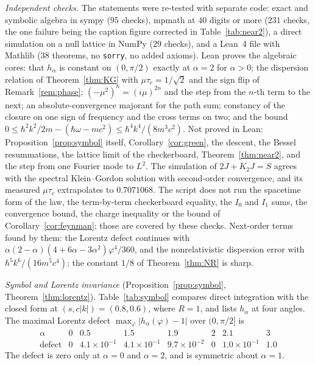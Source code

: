 \documentclass[11pt]{amsart}
\theoremstyle{definition}
\theoremstyle{remark}
\begin{document}
\emph{Independent checks.} The statements were re-tested with separate code: exact and symbolic algebra in sympy ($95$ checks), mpmath at $40$ digits or more ($231$ checks, the one failure being the caption figure corrected in Table~\ref{tab:near2}), a direct simulation on a null lattice in NumPy ($29$ checks), and a Lean~4 file with Mathlib ($38$ theorems, no \texttt{sorry}, no added axioms). Lean proves the algebraic cores: that $h_\alpha$ is constant on $(0,\pi/2)$ exactly at $\alpha=2$ for $\alpha>0$; the dispersion relation of Theorem~\ref{thm:KG} with $\mu\tau_c=1/\sqrt2$ and the sign flip of Remark~\ref{rem:phase}; $(-\mu^2)^n=(i\mu)^{2n}$ and the step from the $n$-th term to the next; an absolute-convergence majorant for the path sum; constancy of the closure on one sign of frequency and the cross terms on two; and the bound $0\le\hbar^2k^2/2m-(\hbar\omega-mc^2)\le\hbar^4k^4/(8m^3c^2)$. Not proved in Lean: Proposition~\ref{prop:symbol} itself, Corollary~\ref{cor:green}, the descent, the Bessel resummations, the lattice limit of the checkerboard, Theorem~\ref{thm:near2}, and the step from one Fourier mode to $L^2$. The simulation of $2J+K_2J=S$ agrees with the spectral Klein--Gordon solution with second-order convergence, and its measured $\mu\tau_c$ extrapolates to $0.7071068$. The script does not run the spacetime form of the law, the term-by-term checkerboard equality, the $I_0$ and $I_1$ sums, the convergence bound, the charge inequality or the bound of Corollary~\ref{cor:feynman}; those are covered by these checks. Next-order terms found by them: the Lorentz defect continues with $\alpha(2-\alpha)(4+6\alpha-3\alpha^2)\varphi^4/360$, and the nonrelativistic dispersion error with $\hbar^5k^6/(16m^5c^4)$; the constant $1/8$ of Theorem~\ref{thm:NR} is sharp.

\emph{Symbol and Lorentz invariance} (Proposition~\ref{prop:symbol}, Theorem~\ref{thm:lorentz}). Table~\ref{tab:symbol} compares direct integration with the closed form at $(s,c\lvert k\rvert)=(0.8,0.6)$, where $R=1$, and lists $h_\alpha$ at four angles. The maximal Lorentz defect $\max_\varphi\lvert h_\alpha(\varphi)-1\rvert$ over $(0,\pi/2]$ is
\[
\begin{array}{c|ccccccc}
\alpha&0&0.5&1.5&1.9&2&2.1&3\\\hline
\text{defect}&0&4.1\times10^{-1}&4.1\times10^{-1}&9.7\times10^{-2}&0&1.0\times10^{-1}&1.0
\end{array}
\]
The defect is zero only at $\alpha=0$ and $\alpha=2$, and is symmetric about $\alpha=1$.
\end{document}
